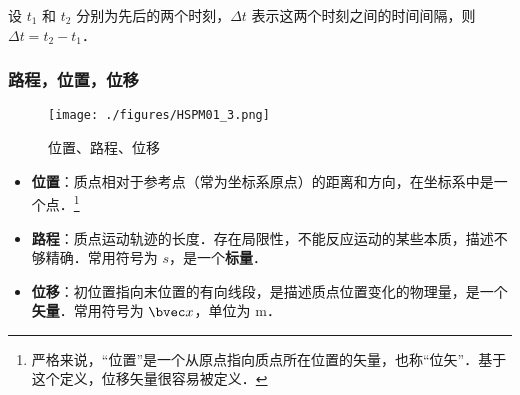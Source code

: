 设 $t_1$ 和 $t_2$ 分别为先后的两个时刻，$\Delta t$ 表示这两个时刻之间的时间间隔，则 $\Delta t = t_2 - t_1$．

\subsubsection{路程，位置，位移}
\begin{figure}[ht]
\centering
\texttt{[image: ./figures/HSPM01\_3.png]}
\caption{位置、路程、位移} \label{HSPM01_fig3}
\end{figure}
\begin{itemize}
\item \textbf{位置}：质点相对于参考点（常为坐标系原点）的距离和方向，在坐标系中是一个点．\footnote{严格来说，“位置”是一个从原点指向质点所在位置的矢量，也称“位矢”．基于这个定义，位移矢量很容易被定义．}
\item \textbf{路程}：质点运动轨迹的长度．存在局限性，不能反应运动的某些本质，描述不够精确．常用符号为 $s$，是一个\textbf{标量}．
\item \textbf{位移}：初位置指向末位置的有向线段，是描述质点位置变化的物理量，是一个\textbf{矢量}．常用符号为 $\bvec x$，单位为 $\mathrm{m}$．
\end{itemize}

